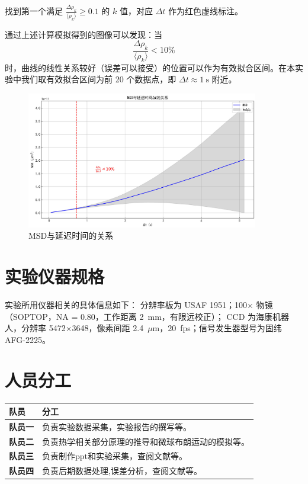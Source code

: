 \documentclass[a4paper]{report} %
\begin{document}
找到第一个满足 $\frac{\Delta \rho_k}{\langle \rho_k \rangle} \geq 0.1$ 的 $k$ 值，对应 $\Delta t$ 作为红色虚线标注。

通过上述计算模拟得到的图像可以发现：当 
\[
\frac{\Delta \rho_k}{\langle \rho_k \rangle} < 10\%
\]
时，曲线的线性关系较好（误差可以接受）的位置可以作为有效拟合区间。在本实验中我们取有效拟合区间为前 20 个数据点，即 $\Delta t \approx 1 \ \text{s}$ 附近。

\begin{figure}[H]
    \centering
    \includegraphics[width=0.9\textwidth]{取1.jpg}
    \caption{MSD与延迟时间的关系}
    \label{fig:let1}
\end{figure}
\section{实验仪器规格}
实验所用仪器相关的具体信息如下：
分辨率板为 USAF 1951；100$\times$ 物镜（SOPTOP，NA = 0.80，工作距离 2~mm，有限远校正）；
CCD 为海康机器人，分辨率 5472$\times$3648，像素间距 2.4~$\mu$m，20~fps；信号发生器型号为固纬 AFG-2225。
\section{人员分工}
\renewcommand{\arraystretch}{1.3} %

\begin{tabularx}{\textwidth}{>{\bfseries}l X}
\toprule
队员 & 分工 \\
\midrule
队员一 & 负责实验数据采集，实验报告的撰写等。 \\
队员二 & 负责热学相关部分原理的推导和微球布朗运动的模拟等。 \\
队员三 & 负责制作ppt和实验采集，查阅文献等。 \\
队员四 & 负责后期数据处理,误差分析，查阅文献等。 \\
\bottomrule
\end{tabularx}
\end{document}
